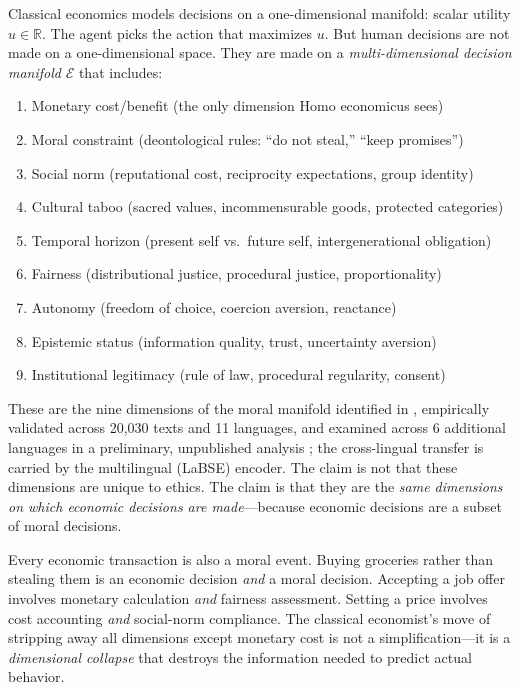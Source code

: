 \documentclass[12pt]{article}
\theoremstyle{definition}
\theoremstyle{remark}
\newcommand{\E}{\mathcal{E}}               %
\newcommand{\R}{\mathbb{R}}
\begin{document}
Classical economics models decisions on a one-dimensional manifold: scalar utility $u \in \R$.  The agent picks the action that maximizes $u$.  But human decisions are not made on a one-dimensional space.  They are made on a \emph{multi-dimensional decision manifold} $\E$ that includes:

\begin{enumerate}
    \item Monetary cost/benefit (the only dimension Homo economicus sees)
    \item Moral constraint (deontological rules: ``do not steal,'' ``keep promises'')
    \item Social norm (reputational cost, reciprocity expectations, group identity)
    \item Cultural taboo (sacred values, incommensurable goods, protected categories)
    \item Temporal horizon (present self vs.\ future self, intergenerational obligation)
    \item Fairness (distributional justice, procedural justice, proportionality)
    \item Autonomy (freedom of choice, coercion aversion, reactance)
    \item Epistemic status (information quality, trust, uncertainty aversion)
    \item Institutional legitimacy (rule of law, procedural regularity, consent)
\end{enumerate}

These are the nine dimensions of the moral manifold identified in \cite{bond2026geometric}, empirically validated across 20,030 texts and 11 languages, and examined across 6 additional languages in a preliminary, unpublished analysis \cite{thiele2026}; the cross-lingual transfer is carried by the multilingual (LaBSE) encoder.  The claim is not that these dimensions are unique to ethics.  The claim is that they are the \emph{same dimensions on which economic decisions are made}---because economic decisions are a subset of moral decisions.

Every economic transaction is also a moral event.  Buying groceries rather than stealing them is an economic decision \emph{and} a moral decision.  Accepting a job offer involves monetary calculation \emph{and} fairness assessment.  Setting a price involves cost accounting \emph{and} social-norm compliance.  The classical economist's move of stripping away all dimensions except monetary cost is not a simplification---it is a \emph{dimensional collapse} that destroys the information needed to predict actual behavior.
\end{document}
